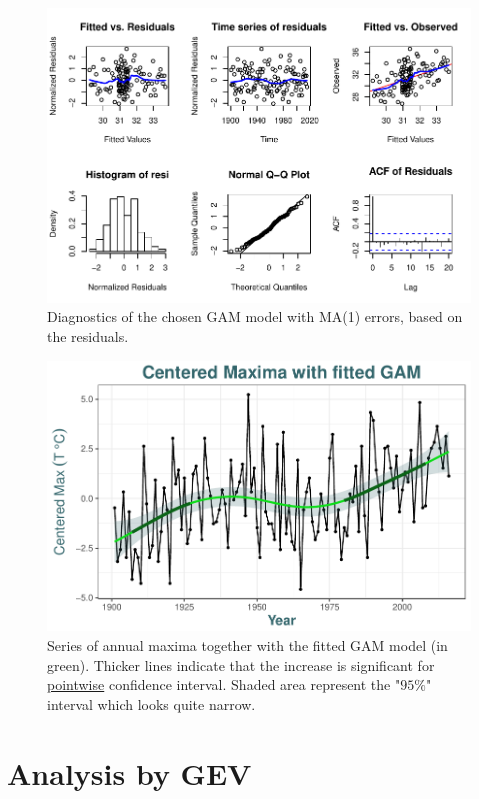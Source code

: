 \begin{figure}[!htb]
\centering	\includegraphics[width=.85\linewidth]{diagnogam.pdf}\caption{Diagnostics of the chosen GAM model with MA(1) errors, based on the residuals. }\label{fig:diagnogam}
\end{figure}


\begin{figure}[!htb]
\centering	\includegraphics[width=.7\linewidth]{max_gam.pdf}\caption{Series of annual maxima together with the fitted GAM model (in green). Thicker lines indicate that the increase is significant for \underline{pointwise} confidence interval. Shaded area represent the "$95\%$" interval which looks quite narrow. }\label{fig:center_gam}
\end{figure}




\section{Analysis by GEV}


